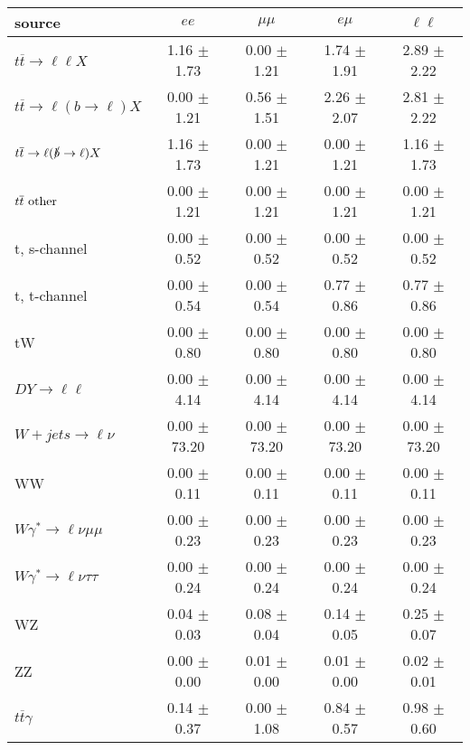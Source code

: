\begin{tabular}{l|cccc} \hline\hline
source & $ee$ & $\mu\mu$ & $e\mu$ & $\ell\ell $ \\
\hline
$t\overline{t} \rightarrow \ell \ell X$ &  1.16 $\pm$  1.73 &  0.00 $\pm$  1.21 &  1.74 $\pm$  1.91 &  2.89 $\pm$  2.22 \\
$t\overline{t} \rightarrow \ell (b \rightarrow \ell) X$ &  0.00 $\pm$  1.21 &  0.56 $\pm$  1.51 &  2.26 $\pm$  2.07 &  2.81 $\pm$  2.22 \\
$t\overline{t} \rightarrow \ell (\slashed b \rightarrow \ell) X$ &  1.16 $\pm$  1.73 &  0.00 $\pm$  1.21 &  0.00 $\pm$  1.21 &  1.16 $\pm$  1.73 \\
        $t\overline{t}\ \rm{other}$ &  0.00 $\pm$  1.21 &  0.00 $\pm$  1.21 &  0.00 $\pm$  1.21 &  0.00 $\pm$  1.21 \\
\hline
                       t, s-channel &  0.00 $\pm$  0.52 &  0.00 $\pm$  0.52 &  0.00 $\pm$  0.52 &  0.00 $\pm$  0.52 \\
                       t, t-channel &  0.00 $\pm$  0.54 &  0.00 $\pm$  0.54 &  0.77 $\pm$  0.86 &  0.77 $\pm$  0.86 \\
                                 tW &  0.00 $\pm$  0.80 &  0.00 $\pm$  0.80 &  0.00 $\pm$  0.80 &  0.00 $\pm$  0.80 \\
\hline
         $DY \rightarrow \ell \ell$ &  0.00 $\pm$  4.14 &  0.00 $\pm$  4.14 &  0.00 $\pm$  4.14 &  0.00 $\pm$  4.14 \\
      $W+jets \rightarrow \ell \nu$ &  0.00 $\pm$ 73.20 &  0.00 $\pm$ 73.20 &  0.00 $\pm$ 73.20 &  0.00 $\pm$ 73.20 \\
                                 WW &  0.00 $\pm$  0.11 &  0.00 $\pm$  0.11 &  0.00 $\pm$  0.11 &  0.00 $\pm$  0.11 \\
\hline
$W\gamma^{*} \rightarrow \ell \nu \mu\mu$ &  0.00 $\pm$  0.23 &  0.00 $\pm$  0.23 &  0.00 $\pm$  0.23 &  0.00 $\pm$  0.23 \\
$W\gamma^{*} \rightarrow \ell \nu \tau\tau$ &  0.00 $\pm$  0.24 &  0.00 $\pm$  0.24 &  0.00 $\pm$  0.24 &  0.00 $\pm$  0.24 \\
                                 WZ &  0.04 $\pm$  0.03 &  0.08 $\pm$  0.04 &  0.14 $\pm$  0.05 &  0.25 $\pm$  0.07 \\
                                 ZZ &  0.00 $\pm$  0.00 &  0.01 $\pm$  0.00 &  0.01 $\pm$  0.00 &  0.02 $\pm$  0.01 \\
\hline
              $t\overline{t}\gamma$ &  0.14 $\pm$  0.37 &  0.00 $\pm$  1.08 &  0.84 $\pm$  0.57 &  0.98 $\pm$  0.60 \\

\end{tabular}
